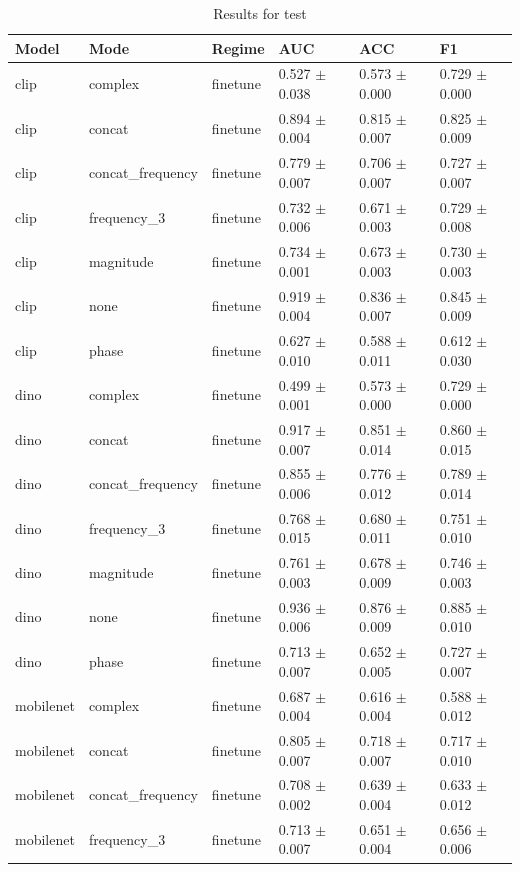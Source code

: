 \begin{table}
\caption{Results for test}
\label{tab:results_test}
\begin{tabular}{llllll}
\toprule
Model & Mode & Regime & AUC & ACC & F1 \\
\midrule
clip & complex & finetune & 0.527 $\pm$ 0.038 & 0.573 $\pm$ 0.000 & 0.729 $\pm$ 0.000 \\
clip & concat & finetune & 0.894 $\pm$ 0.004 & 0.815 $\pm$ 0.007 & 0.825 $\pm$ 0.009 \\
clip & concat_frequency & finetune & 0.779 $\pm$ 0.007 & 0.706 $\pm$ 0.007 & 0.727 $\pm$ 0.007 \\
clip & frequency_3 & finetune & 0.732 $\pm$ 0.006 & 0.671 $\pm$ 0.003 & 0.729 $\pm$ 0.008 \\
clip & magnitude & finetune & 0.734 $\pm$ 0.001 & 0.673 $\pm$ 0.003 & 0.730 $\pm$ 0.003 \\
clip & none & finetune & 0.919 $\pm$ 0.004 & 0.836 $\pm$ 0.007 & 0.845 $\pm$ 0.009 \\
clip & phase & finetune & 0.627 $\pm$ 0.010 & 0.588 $\pm$ 0.011 & 0.612 $\pm$ 0.030 \\
dino & complex & finetune & 0.499 $\pm$ 0.001 & 0.573 $\pm$ 0.000 & 0.729 $\pm$ 0.000 \\
dino & concat & finetune & 0.917 $\pm$ 0.007 & 0.851 $\pm$ 0.014 & 0.860 $\pm$ 0.015 \\
dino & concat_frequency & finetune & 0.855 $\pm$ 0.006 & 0.776 $\pm$ 0.012 & 0.789 $\pm$ 0.014 \\
dino & frequency_3 & finetune & 0.768 $\pm$ 0.015 & 0.680 $\pm$ 0.011 & 0.751 $\pm$ 0.010 \\
dino & magnitude & finetune & 0.761 $\pm$ 0.003 & 0.678 $\pm$ 0.009 & 0.746 $\pm$ 0.003 \\
dino & none & finetune & 0.936 $\pm$ 0.006 & 0.876 $\pm$ 0.009 & 0.885 $\pm$ 0.010 \\
dino & phase & finetune & 0.713 $\pm$ 0.007 & 0.652 $\pm$ 0.005 & 0.727 $\pm$ 0.007 \\
mobilenet & complex & finetune & 0.687 $\pm$ 0.004 & 0.616 $\pm$ 0.004 & 0.588 $\pm$ 0.012 \\
mobilenet & concat & finetune & 0.805 $\pm$ 0.007 & 0.718 $\pm$ 0.007 & 0.717 $\pm$ 0.010 \\
mobilenet & concat_frequency & finetune & 0.708 $\pm$ 0.002 & 0.639 $\pm$ 0.004 & 0.633 $\pm$ 0.012 \\
mobilenet & frequency_3 & finetune & 0.713 $\pm$ 0.007 & 0.651 $\pm$ 0.004 & 0.656 $\pm$ 0.006 \\

\end{tabular}
\end{table}
